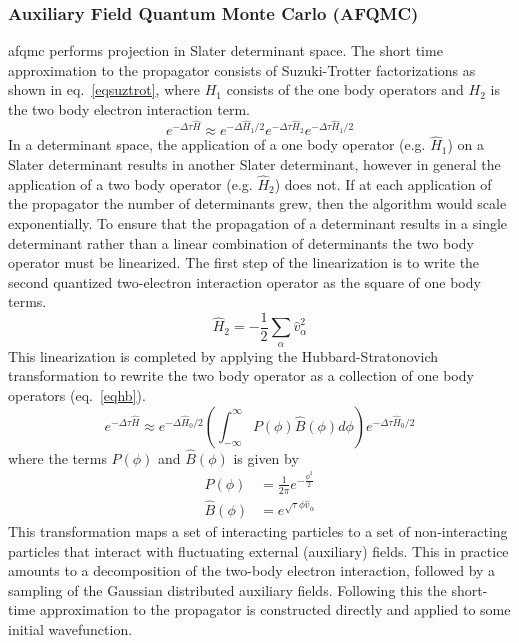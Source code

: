 \subsubsection{Auxiliary Field Quantum Monte Carlo (AFQMC)}
\gls{afqmc} performs projection in Slater determinant space.
The short time approximation to the propagator consists of Suzuki-Trotter factorizations as shown in eq.~\ref{eqsuztrot}, where $H_1$ consists of the one body operators and $H_2$ is the two body electron interaction term.
\begin{equation}
e^{-\Delta\tau\hat{H}} \approx e^{-\Delta\hat{H}_1/2} e^{-\Delta\tau\hat{H}_2} e^{-\Delta\tau\hat{H}_1/2}
\label{eqsuztrot}
\end{equation}
In a determinant space, the application of a one body operator (e.g. $\hat{H}_1$) on a Slater determinant results in another Slater determinant, however in general the application of a two body operator (e.g. $\hat{H}_2$) does not.
If at each application of the propagator the number of determinants grew, then the algorithm would scale exponentially. 
To ensure that the propagation of a determinant results in a single determinant rather than a linear combination of determinants the two body operator must be linearized.
The first step of the linearization is to write the second quantized two-electron interaction operator as the square of one body terms.
\begin{equation}
    \hat{H}_2 = -\frac{1}{2} \sum_{\alpha} \hat{v}^2_{\alpha}
    \label{eqdecomp}
\end{equation}
This linearization is completed by applying the Hubbard-Stratonovich transformation to rewrite the two body operator as a collection of one body operators (eq.~\ref{eqhb}).\cite{10.1103/PhysRevLett.3.77a,zotero-4182}
\begin{equation}
e^{-\Delta\tau\hat{H}} \approx e^{-\Delta\hat{H}_0/2} \left( \int_{-\infty}^{\infty} P(\phi) \hat{B}(\phi) d\phi \right) e^{-\Delta\tau\hat{H}_0/2}
\label{eqhb}
\end{equation}
where the terms $P(\phi)$ and $\hat{B}(\phi)$ is given by
\begin{align}
    P(\phi) &= \frac{1}{2\pi} e^{-\frac{\phi^2}{2}} \\
    \hat{B}(\phi) &= e^{\sqrt{\tau} \phi \hat{v}_{\alpha}}
    \label{eqhb2}
\end{align}
This transformation maps a set of interacting particles to a set of non-interacting particles that interact with fluctuating external (auxiliary) fields.
This in practice amounts to a decomposition of the two-body electron interaction, followed by a sampling of the Gaussian distributed auxiliary fields.
Following this the short-time approximation to the propagator is constructed directly and applied to some initial wavefunction.

